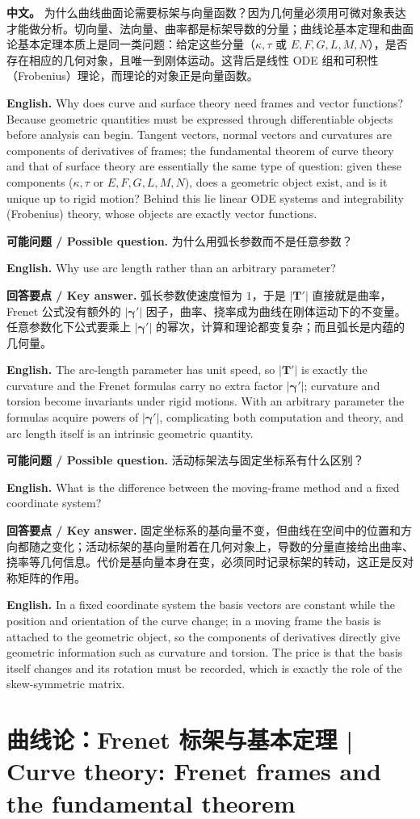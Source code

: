 \documentclass[UTF8,11pt,a4paper]{ctexart}
\newcommand{\APS}[2]{\par\noindent\textbf{中文。} #1\par\noindent\textbf{English.} #2\par\smallskip}
\newcommand{\EN}[1]{\par\noindent \textbf{English.} #1\par}
\newcommand{\ASK}[4]{\par\noindent \textbf{可能问题 / Possible question.} #1\par\EN{#2}\noindent \textbf{回答要点 / Key answer.} #3\par\EN{#4}\medskip}
\newcommand{\bT}{\mathbf{T}}
\newcommand{\bgamma}{\boldsymbol{\gamma}}
\begin{document}
\APS{为什么曲线曲面论需要标架与向量函数？因为几何量必须用可微对象表达才能做分析。切向量、法向量、曲率都是标架导数的分量；曲线论基本定理和曲面论基本定理本质上是同一类问题：给定这些分量（$\kappa,\tau$ 或 $E,F,G,L,M,N$），是否存在相应的几何对象，且唯一到刚体运动。这背后是线性 ODE 组和可积性（Frobenius）理论，而理论的对象正是向量函数。}{Why does curve and surface theory need frames and vector functions? Because geometric quantities must be expressed through differentiable objects before analysis can begin. Tangent vectors, normal vectors and curvatures are components of derivatives of frames; the fundamental theorem of curve theory and that of surface theory are essentially the same type of question: given these components ($\kappa,\tau$ or $E,F,G,L,M,N$), does a geometric object exist, and is it unique up to rigid motion? Behind this lie linear ODE systems and integrability (Frobenius) theory, whose objects are exactly vector functions.}
\ASK{为什么用弧长参数而不是任意参数？}{Why use arc length rather than an arbitrary parameter?}{弧长参数使速度恒为 $1$，于是 $|\bT'|$ 直接就是曲率，Frenet 公式没有额外的 $|\bgamma'|$ 因子，曲率、挠率成为曲线在刚体运动下的不变量。任意参数化下公式要乘上 $|\bgamma'|$ 的幂次，计算和理论都变复杂；而且弧长是内蕴的几何量。}{The arc-length parameter has unit speed, so $|\bT'|$ is exactly the curvature and the Frenet formulas carry no extra factor $|\bgamma'|$; curvature and torsion become invariants under rigid motions. With an arbitrary parameter the formulas acquire powers of $|\bgamma'|$, complicating both computation and theory, and arc length itself is an intrinsic geometric quantity.}
\ASK{活动标架法与固定坐标系有什么区别？}{What is the difference between the moving-frame method and a fixed coordinate system?}{固定坐标系的基向量不变，但曲线在空间中的位置和方向都随之变化；活动标架的基向量附着在几何对象上，导数的分量直接给出曲率、挠率等几何信息。代价是基向量本身在变，必须同时记录标架的转动，这正是反对称矩阵的作用。}{In a fixed coordinate system the basis vectors are constant while the position and orientation of the curve change; in a moving frame the basis is attached to the geometric object, so the components of derivatives directly give geometric information such as curvature and torsion. The price is that the basis itself changes and its rotation must be recorded, which is exactly the role of the skew-symmetric matrix.}

\section[曲线论]{曲线论：Frenet 标架与基本定理 | Curve theory: Frenet frames and the fundamental theorem}
\end{document}
